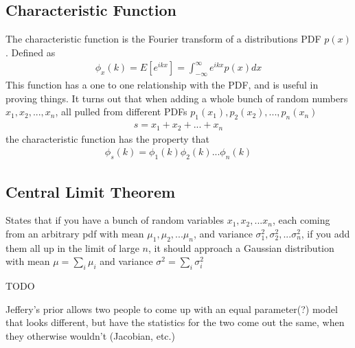 \subsection{Characteristic Function}
The characteristic function is the Fourier transform of a distributions PDF $p(x)$. Defined as 
\begin{align}
\phi_x(k) = E[e^{ikx}] = \int_{-\infty}^\infty e^{ikx}p(x)dx
\end{align}
This function has a one to one relationship with the PDF, and is useful in proving things. It turns out that when adding a whole bunch of random numbers $x_1, x_2, ..., x_n$, all pulled from different PDFs $p_1(x_1), p_2(x_2), ..., p_n(x_n)$
\begin{align}
s = x_1 + x_2 + ... + x_n
\end{align}
the characteristic function has the property that
\begin{align}
\phi_s(k) =\phi_1(k)\phi_2(k)...\phi_n(k)
\end{align}


\subsection{Central Limit Theorem}
States that if you have a bunch of random variables $x_1, x_2, ... x_n$, each coming from an arbitrary pdf with mean $\mu_1, \mu_2, ... \mu_n$, and variance $\sigma_1^2, \sigma_2^2, ...\sigma_n^2$, if you add them all up in the limit of large $n$, it should approach a Gaussian distribution with mean $\mu = \sum_i \mu_i$ and variance $\sigma^2 = \sum_i\sigma_i^2$

TODO

Jeffery's prior allows two people to come up with an equal parameter(?) model that looks different, but have the statistics for the two come out the same, when they otherwise wouldn't (Jacobian, etc.)

